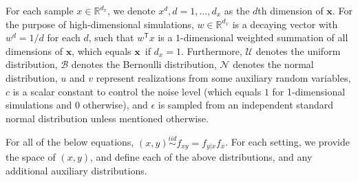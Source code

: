 \documentclass[11pt]{article}
\providecommand{\mb}[1]{\boldsymbol{#1}}
\providecommand{\mc}[1]{\mathcal{#1}}
\newcommand{\Real}{\mathbb{R}}
\newcommand{\T}{^{\ensuremath{\mathsf{T}}}}           %
\newcommand{\mbx}{\ensuremath{\mb{x}}}
\begin{document}
For each sample $x \in \Real^{d_{x}}$, we denote $x^{d}, d=1,\ldots,d_{x}$ as the $d$th dimension of \mbx. For the purpose of high-dimensional simulations, $w \in \Real^{d_{x}}$ is a decaying vector with $w^{d}=1/d$ for each $d$, such that $w\T x$ is a $1$-dimensional weighted summation of all dimensions of \mbx, which equals \mbx~if $d_{x}=1$. Furthermore, $\mc{U}$ denotes the uniform distribution, $\mc{B}$ denotes the Bernoulli distribution, $\mc{N}$ denotes the normal distribution, $u$ and $v$ represent realizations from some auxiliary random variables, $c$ is a scalar constant to control the noise level (which equals $1$ for 1-dimensional simulations and $0$ otherwise), and $\epsilon$ is sampled from an independent standard normal distribution unless mentioned otherwise. 

For all of the below equations, $(x,y) \overset{iid}{\sim} f_{xy} = f_{y|x} f_x$. For each setting, we provide the space of $(x,y)$, and define each of the above distributions, and any additional auxiliary distributions.
\end{document}
